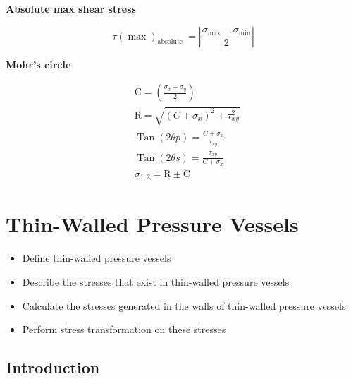 \documentclass[
  letterpaper,
  DIV=11,
  numbers=noendperiod]{scrreprt}
\providecommand{\tightlist}{%
  \setlength{\itemsep}{0pt}\setlength{\parskip}{0pt}}\usepackage{longtable,booktabs,array}
\begin{document}
\begin{tcolorbox}
\textbf{Absolute max shear stress}

\[
\tau(\max )_{\text {absolute }}=\left|\frac{\sigma_{\max }-\sigma_{\min }}{2}\right|
\]

\textbf{Mohr's circle}

\[
\begin{aligned}
& \mathrm{C}=\left(\frac{\sigma_x+\sigma_y}{2}\right) \\
& \mathrm{R}=\sqrt{\left(C+\sigma_x\right)^2+\tau_{x y}^2} \\
& \operatorname{Tan}(2 \theta p)=\frac{C+\sigma_x}{\tau_{x y}} \\
& \operatorname{Tan}(2 \theta s)=\frac{\tau_{x y}}{C+\sigma_x} \\
& \sigma_{1,2}=\mathrm{R} \pm \mathrm{C}
\end{aligned}
\]

\end{tcolorbox}


\chapter{Thin-Walled Pressure
Vessels}\label{sec-thin-walled-pressure-vessels}

\begin{tcolorbox}[enhanced jigsaw, breakable, opacityback=0, toptitle=1mm, left=2mm, colback=white, opacitybacktitle=0.6, colframe=quarto-callout-note-color-frame, titlerule=0mm, arc=.35mm, leftrule=.75mm, bottomtitle=1mm, colbacktitle=quarto-callout-note-color!10!white, rightrule=.15mm, title={Learning Objectives}, bottomrule=.15mm, toprule=.15mm, coltitle=black]

\begin{itemize}
\tightlist
\item
  Define thin-walled pressure vessels
\item
  Describe the stresses that exist in thin-walled pressure vessels
\item
  Calculate the stresses generated in the walls of thin-walled pressure
  vessels
\item
  Perform stress transformation on these stresses
\end{itemize}

\end{tcolorbox}

\section{Introduction}\label{introduction-13}
\end{document}
